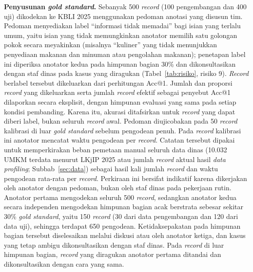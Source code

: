 \textbf{Penyusunan \textit{gold standard}.} Sebanyak 500 \textit{record} (100 pengembangan dan 400 uji) dikodekan ke KBLI 2025 menggunakan pedoman anotasi yang disusun tim. Pedoman menyediakan label ``informasi tidak memadai'' bagi isian yang terlalu umum, yaitu isian yang tidak memungkinkan anotator memilih satu golongan pokok secara meyakinkan (misalnya ``kuliner'' yang tidak menunjukkan penyediaan makanan dan minuman atau pengolahan makanan); penetapan label ini diperiksa anotator kedua pada himpunan bagian 30\% dan dikonsultasikan dengan staf dinas pada kasus yang diragukan (Tabel~\ref{tab:risiko}, risiko 9). \textit{Record} berlabel tersebut dikeluarkan dari perhitungan Acc@1. Jumlah dan proporsi \textit{record} yang dikeluarkan serta jumlah \textit{record} efektif sebagai penyebut Acc@1 dilaporkan secara eksplisit, dengan himpunan evaluasi yang sama pada setiap kondisi pembanding. Karena itu, akurasi ditafsirkan untuk \textit{record} yang dapat diberi label, bukan seluruh \textit{record} awal. Pedoman diujicobakan pada 50 \textit{record} kalibrasi di luar \textit{gold standard} sebelum pengodean penuh. Pada \textit{record} kalibrasi ini anotator mencatat waktu pengodean per \textit{record}. Catatan tersebut dipakai untuk memperkirakan beban pemetaan manual seluruh data dinas (10.032 UMKM terdata menurut LKjIP 2025 atau jumlah \textit{record} aktual hasil \textit{data profiling}; Subbab~\ref{sec:data}) sebagai hasil kali jumlah \textit{record} dan waktu pengodean rata-rata per \textit{record}. Perkiraan ini bersifat indikatif karena dikerjakan oleh anotator dengan pedoman, bukan oleh staf dinas pada pekerjaan rutin. Anotator pertama mengodekan seluruh 500 \textit{record}, sedangkan anotator kedua secara independen mengodekan himpunan bagian acak berstrata sebesar sekitar 30\% \textit{gold standard}, yaitu 150 \textit{record} (30 dari data pengembangan dan 120 dari data uji), sehingga terdapat 650 pengodean. Ketidaksepakatan pada himpunan bagian tersebut diselesaikan melalui diskusi atau oleh anotator ketiga, dan kasus yang tetap ambigu dikonsultasikan dengan staf dinas. Pada \textit{record} di luar himpunan bagian, \textit{record} yang diragukan anotator pertama ditandai dan dikonsultasikan dengan cara yang sama.

